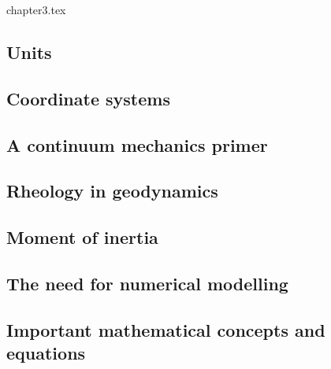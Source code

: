 \begin{flushright} {\tiny {\color{gray} chapter3.tex}} \end{flushright}

\subsection{Units}  %
\subsection{Coordinate systems}  \label{ss:coordsys} %
\subsection{A continuum mechanics primer} %
\subsection{Rheology in geodynamics}  %
\subsection{Moment of inertia}  %
\subsection{The need for numerical modelling} %
\newpage
\subsection{Important mathematical concepts and equations}  \label{ss:maths} %
